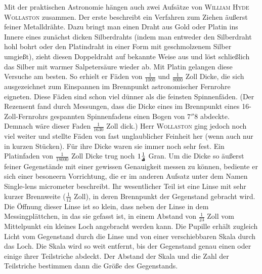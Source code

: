 Mit der praktischen Astronomie hängen auch zwei Aufsätze von \textsc{William Hyde Wollaston} zusammen. Der erste beschreibt ein Verfahren zum Ziehen äußerst feiner Metalldrähte. Dazu bringt man einen Draht aus Gold oder Platin ins Innere eines zunächst dicken Silberdrahts (indem man entweder den Silberdraht hohl bohrt oder den Platindraht in einer Form mit geschmolzenem Silber umgießt), zieht diesen Doppeldraht auf bekannte Weise aus und löst schließlich das Silber mit warmer Salpetersäure wieder ab. Mit Platin gelangen diese Versuche am besten. So erhielt er Fäden von $\frac{1}{1000}$ und $\frac{1}{8000}$ Zoll Dicke, die sich ausgezeichnet zum Einspannen im Brennpunkt astronomischer Fernrohre eigneten. Diese Fäden sind schon viel dünner als die feinsten Spinnenfäden. (Der Rezensent fand durch Messungen, dass die Dicke eines im Brennpunkt eines 16-Zoll-Fernrohrs gespannten Spinnenfadens einen Bogen von $7''8$ abdeckte. Demnach wäre dieser Faden $\frac{1}{1630}$ Zoll dick.) Herr \textsc{Wollaston} ging jedoch noch viel weiter und stellte Fäden von fast unglaublicher Feinheit her (wenn auch nur in kurzen Stücken). Für ihre Dicke waren sie immer noch sehr fest. Ein Platinfaden von $\frac{1}{18000}$ Zoll Dicke trug noch $1\frac{1}{\ObservedWollastonDenominator}$ Gran. Um die Dicke so äußerst feiner Gegenstände mit einer gewissen Genauigkeit messen zu können, bediente er sich einer besoneern Vorrichtung, die er im anderen Aufsatz unter dem Namen Single-lens micrometer beschreibt. Ihr wesentlicher Teil ist eine Linse mit sehr kurzer Brennweite ($\frac{1}{12}$ Zoll), in deren Brennpunkt der Gegenstand gebracht wird. Die Öffnung dieser Linse ist so klein, dass neben der Linse in dem Messingplättchen, in das sie gefasst ist, in einem Abstand von $\frac{1}{23}$ Zoll vom Mittelpunkt ein kleines Loch angebracht werden kann. Die Pupille erhält zugleich Licht vom Gegenstand durch die Linse und von einer verschiebbaren Skala durch das Loch. Die Skala wird so weit entfernt, bis der Gegenstand genau einen oder einige ihrer Teilstriche abdeckt. Der Abstand der Skala und die Zahl der Teilstriche bestimmen dann die Größe des Gegenstands.

